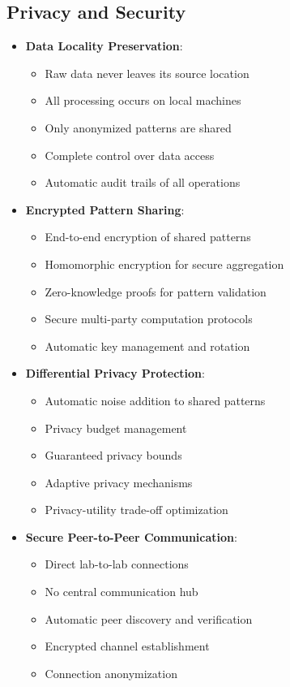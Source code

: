 \documentclass[11pt,a4paper]{article}
\begin{document}
\subsection{Privacy and Security}
\begin{itemize}
    \item \textbf{Data Locality Preservation}:
    \begin{itemize}
        \item Raw data never leaves its source location
        \item All processing occurs on local machines
        \item Only anonymized patterns are shared
        \item Complete control over data access
        \item Automatic audit trails of all operations
    \end{itemize}
    
    \item \textbf{Encrypted Pattern Sharing}:
    \begin{itemize}
        \item End-to-end encryption of shared patterns
        \item Homomorphic encryption for secure aggregation
        \item Zero-knowledge proofs for pattern validation
        \item Secure multi-party computation protocols
        \item Automatic key management and rotation
    \end{itemize}
    
    \item \textbf{Differential Privacy Protection}:
    \begin{itemize}
        \item Automatic noise addition to shared patterns
        \item Privacy budget management
        \item Guaranteed privacy bounds
        \item Adaptive privacy mechanisms
        \item Privacy-utility trade-off optimization
    \end{itemize}
    
    \item \textbf{Secure Peer-to-Peer Communication}:
    \begin{itemize}
        \item Direct lab-to-lab connections
        \item No central communication hub
        \item Automatic peer discovery and verification
        \item Encrypted channel establishment
        \item Connection anonymization
    \end{itemize}
\end{itemize}
\end{document}
